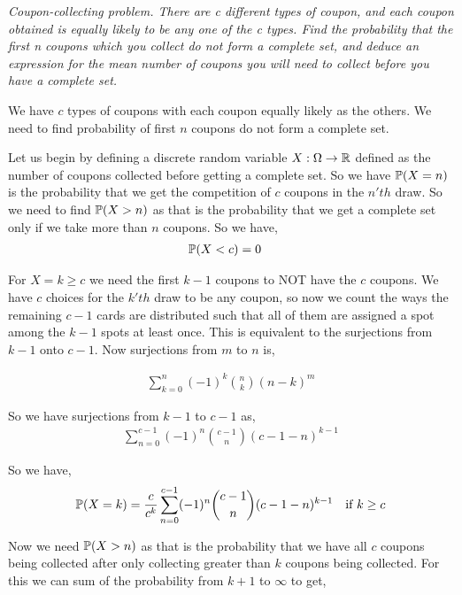 \documentclass[a4paper]{report}
\begin{document}
\textit{Coupon-collecting problem. There are c different types of coupon, and each coupon obtained
is equally likely to be any one of the c types. Find the probability that the first n coupons
which you collect do not form a complete set, and deduce an expression for the mean number
of coupons you will need to collect before you have a complete set.}



We have $c$ types of coupons with each coupon equally likely as the others. We need to find probability of first $n$ coupons do not form a complete set.

\vspace{1em}

Let us begin by defining a discrete random variable $X : \Omega \to \R$ defined as the number of coupons collected before getting a complete set. So we have $\P(X = n)$ is the probability that we get the competition of $c$ coupons in the $n'th$ draw. So we need to find  $\P(X > n)$ as that  is the probability that we get  a complete set only if we take more than $n$ coupons. So we have, 
 \begin{align*}
	 \P(X < c) &= 0
\end{align*}

For $X = k \ge c$ we need the first $k - 1$ coupons to NOT have the $c$ coupons. We have $c$ choices for the $k'th$ draw to be any coupon, so now we count the ways the remaining $c - 1$ cards are distributed such that all of them are assigned a spot among the $k - 1$ spots at least once. This is equivalent to the surjections from $k - 1$ onto $c - 1$. Now surjections from $m$ to $n$ is,

\begin{align*}
	\sum_{k = 0}^{n}  (-1)^{k} {n \choose k} (n - k)^{m}
\end{align*}

So we have surjections from $k - 1$ to $c - 1$	 as, 
\begin{align*}
	\sum_{n = 0}^{c - 1}  (-1)^{n} {c - 1 \choose n} (c - 1 - n)^{k - 1}
\end{align*}


So we have, 
\begin{align*}
	\P(X = k) = \frac{c}{c^{k}}	\sum_{n = 0}^{c - 1}  (-1)^{n} {c - 1 \choose n} (c - 1 - n)^{k - 1} \quad \text{if $k \ge c$}
\end{align*}	


Now we need $\P(X > n) $ as that is the probability that we have all $c$ coupons being collected after only collecting greater than $k$ coupons being collected. For this we can sum of the probability from $k + 1$ to $\infty$ to get,
\end{document}
